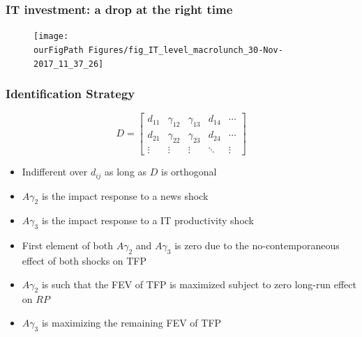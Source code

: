 \documentclass{beamer}
\def \ourFigPath {../../}
\begin{document}
\begin{frame}
	\frametitle{IT investment: a drop at the right time}
	\label{it_investment}
	
	\noindent
	\begin{figure}
		\centering
		\texttt{[image: \\ourFigPath Figures/fig\_IT\_level\_macrolunch\_30-Nov-2017\_11\_37\_26]}
	\end{figure}

	
\hyperlink{convincing}{}	
\end{frame}

\begin{frame}
\frametitle{Identification Strategy}
\label{Technicalities}

\begin{equation}
D = \begin{bmatrix}
d_{11} & \gamma_{12} & \gamma_{13} & d_{14} & \cdots \\
d_{21} & \gamma_{22} & \gamma_{23} & d_{24} & \cdots \\
\vdots & \vdots & \vdots & \ddots & \vdots 
\end{bmatrix}
\end{equation}

\begin{itemize}
	\item Indifferent over $d_{ij}$ as long as $D$ is orthogonal
	\item $A \gamma_{2}$ is the impact response to a news shock
	\item $A \gamma_{3}$ is the impact response to a IT productivity shock
	\item First element of both $A \gamma_{2}$ and $A \gamma_{3}$ is zero due to the no-contemporaneous effect of both shocks on TFP
	\item $A \gamma_2$ is such that the FEV of TFP is maximized subject to zero long-run effect on $RP$
	\item $A \gamma_3$ is maximizing the remaining FEV of TFP 
\end{itemize} 


\hyperlink{identification}{}	
\end{frame}
	
	
\end{document}
